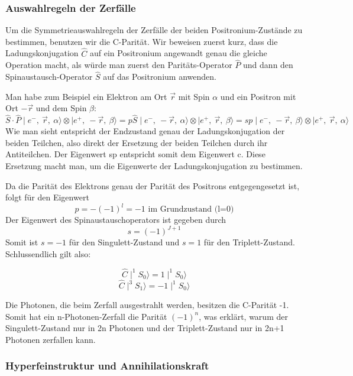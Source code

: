 \subsubsection{Auswahlregeln der Zerfälle \label{4}}

Um die Symmetrieauswahlregeln der Zerfälle der beiden Positronium-Zustände zu bestimmen, benutzen wir die C-Parität. Wir beweisen zuerst kurz, dass die Ladungskonjugation $\hat C$ auf ein Positronium angewandt genau die gleiche Operation macht, als würde man zuerst den Paritäts-Operator $\hat P$ und dann den Spinaustausch-Operator $\hat S$ auf das Positronium anwenden.

Man habe zum Beispiel ein Elektron am Ort $\vec r$ mit Spin $\alpha$ und ein Positron mit Ort $-\vec r$ und dem Spin $\beta$:
$$\hat S\cdot\hat P\mid e^-,\ \vec r,\ \alpha \rangle \otimes \mid e^+,\ -\vec r,\ \beta \rangle
 = p\hat S\mid e^-,\ -\vec r,\ \alpha \rangle \otimes \mid e^+,\ \vec r,\ \beta \rangle 
 = sp\mid e^-,\ -\vec r,\ \beta \rangle \otimes \mid e^+,\ \vec r,\ \alpha \rangle $$
Wie man sieht entspricht der Endzustand genau der Ladungskonjugation der beiden Teilchen, also direkt der Ersetzung der beiden Teilchen durch ihr Antiteilchen. Der Eigenwert sp entspricht somit dem Eigenwert c. Diese Ersetzung macht man, um die Eigenwerte der Ladungskonjugation zu bestimmen.

Da die Parität des Elektrons genau der Parität des Positrons entgegengesetzt ist, folgt für den Eigenwert
$$p = -(-1)^l = -1 \text{\ \ im Grundzustand (l=0)}$$
Der Eigenwert des Spinaustauschoperators ist gegeben durch $$s=(-1)^{J+1}$$
Somit ist $s=-1$ für den Singulett-Zustand und $s=1$ für den Triplett-Zustand.
Schlussendlich gilt also:

\begin{equation} \hat C \mid ^1S_0 \rangle = 1 \mid ^1S_0 \rangle \end{equation}
\begin{equation} \hat C \mid ^3S_1 \rangle = -1 \mid ^1S_0 \rangle \end{equation}

Die Photonen, die beim Zerfall ausgestrahlt werden, besitzen die C-Parität -1. Somit hat ein n-Photonen-Zerfall die Parität $(-1)^n$, was erklärt, warum der Singulett-Zustand nur in 2n Photonen und der Triplett-Zustand nur in 2n+1 Photonen zerfallen kann.

\subsubsection{Hyperfeinstruktur und Annihilationskraft \label{5}}

